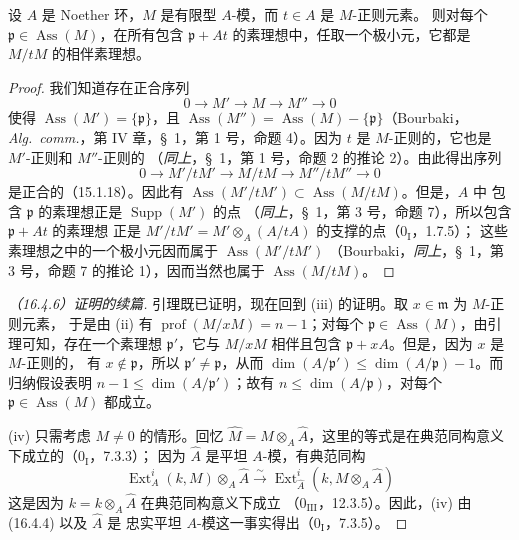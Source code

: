 \begin{lemma}[16.4.6.3]
\label{0.16.4.6.3-fr}
设 $A$ 是 Noether 环，$M$ 是有限型 $A$-模，而 $t\in A$ 是 $M$-正则元素。
则对每个 $\mathfrak{p}\in\operatorname{Ass}(M)$，在所有包含
$\mathfrak{p}+At$ 的素理想中，任取一个极小元，它都是 $M/tM$ 的相伴素理想。
\end{lemma}

\begin{proof}
我们知道存在正合序列
\[
  0\to M'\to M\to M''\to0
\]
使得 $\operatorname{Ass}(M')=\{\mathfrak{p}\}$，且
$\operatorname{Ass}(M'')=\operatorname{Ass}(M)-\{\mathfrak{p}\}$（Bourbaki，
\emph{Alg.~comm.}，第 IV 章，\S~1，第 1 号，命题 4）。因为 $t$ 是
$M$-正则的，它也是 $M'$-正则和 $M''$-正则的
（\emph{同上}，\S~1，第 1 号，命题 2 的推论 2）。由此得出序列
\[
  0\to M'/tM'\to M/tM\to M''/tM''\to0
\]
是正合的（15.1.18）。因此有
$\operatorname{Ass}(M'/tM')\subset\operatorname{Ass}(M/tM)$。但是，$A$ 中
包含 $\mathfrak{p}$ 的素理想正是 $\operatorname{Supp}(M')$ 的点
（\emph{同上}，\S~1，第 3 号，命题 7），所以包含 $\mathfrak{p}+At$ 的素理想
正是 $M'/tM'=M'\otimes_A(A/tA)$ 的支撑的点（$0_{\mathrm I}$，1.7.5）；
这些素理想之中的一个极小元因而属于 $\operatorname{Ass}(M'/tM')$
（Bourbaki，\emph{同上}，\S~1，第 3 号，命题 7 的推论 1），因而当然也属于
$\operatorname{Ass}(M/tM)$。
\end{proof}

\begin{proof}[（16.4.6）证明的续篇]
引理既已证明，现在回到 (iii) 的证明。取 $x\in\mathfrak{m}$ 为 $M$-正则元素，
于是由 (ii) 有 $\operatorname{prof}(M/xM)=n-1$；对每个
$\mathfrak{p}\in\operatorname{Ass}(M)$，由引理可知，存在一个素理想
$\mathfrak{p}'$，它与 $M/xM$ 相伴且包含 $\mathfrak{p}+xA$。但是，因为 $x$ 是 $M$-正则的，
有 $x\notin\mathfrak{p}$，所以 $\mathfrak{p}'\neq\mathfrak{p}$，从而
$\dim(A/\mathfrak{p}')\leq\dim(A/\mathfrak{p})-1$。而归纳假设表明
$n-1\leq\dim(A/\mathfrak{p}')$；故有 $n\leq\dim(A/\mathfrak{p})$，对每个
$\mathfrak{p}\in\operatorname{Ass}(M)$ 都成立。

(iv) 只需考虑 $M\neq0$ 的情形。回忆
$\widehat{M}=M\otimes_A\widehat{A}$，这里的等式是在典范同构意义下成立的（$0_{\mathrm I}$，7.3.3）；
因为 $\widehat{A}$ 是平坦 $A$-模，有典范同构
\[
  \operatorname{Ext}^i_A(k,M)\otimes_A\widehat{A}
  \xrightarrow{\sim}
  \operatorname{Ext}^i_{\widehat{A}}
  (k,M\otimes_A\widehat{A})
\]
这是因为 $k=k\otimes_A\widehat{A}$ 在典范同构意义下成立
（$0_{\mathrm{III}}$，12.3.5）。因此，(iv) 由 (16.4.4) 以及 $\widehat{A}$ 是
忠实平坦 $A$-模这一事实得出（$0_{\mathrm I}$，7.3.5）。
\end{proof}

